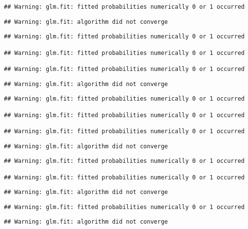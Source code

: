 \documentclass[
]{article}
\begin{document}
\begin{verbatim}
## Warning: glm.fit: fitted probabilities numerically 0 or 1 occurred
\end{verbatim}

\begin{verbatim}
## Warning: glm.fit: algorithm did not converge
\end{verbatim}

\begin{verbatim}
## Warning: glm.fit: fitted probabilities numerically 0 or 1 occurred

## Warning: glm.fit: fitted probabilities numerically 0 or 1 occurred

## Warning: glm.fit: fitted probabilities numerically 0 or 1 occurred
\end{verbatim}

\begin{verbatim}
## Warning: glm.fit: algorithm did not converge
\end{verbatim}

\begin{verbatim}
## Warning: glm.fit: fitted probabilities numerically 0 or 1 occurred

## Warning: glm.fit: fitted probabilities numerically 0 or 1 occurred

## Warning: glm.fit: fitted probabilities numerically 0 or 1 occurred
\end{verbatim}

\begin{verbatim}
## Warning: glm.fit: algorithm did not converge
\end{verbatim}

\begin{verbatim}
## Warning: glm.fit: fitted probabilities numerically 0 or 1 occurred

## Warning: glm.fit: fitted probabilities numerically 0 or 1 occurred
\end{verbatim}

\begin{verbatim}
## Warning: glm.fit: algorithm did not converge
\end{verbatim}

\begin{verbatim}
## Warning: glm.fit: fitted probabilities numerically 0 or 1 occurred
\end{verbatim}

\begin{verbatim}
## Warning: glm.fit: algorithm did not converge
\end{verbatim}
\end{document}
